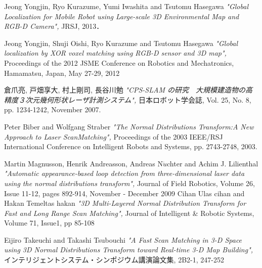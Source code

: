 \begin{thebibliography}{9}
	Jeong Yongjin, Ryo Kurazume, Yumi Iwashita and Tsutomu Hasegawa
	{\itshape "Global Localization for Mobile Robot using Large-scale 3D Environmental Map and RGB-D Camera",}
	 JRSJ, 2013．

	Jeong Yongjin, Shuji Oishi, Ryo Kurazume and Tsutomu Hasegawa
	{\itshape "Global localization by XOR voxel matching using RGB-D sensor and 3D map",}
	Proceedings of the 2012 JSME Conference on Robotics and Mechatronics, Hamamatsu, Japan, May 27-29, 2012 

	倉爪亮, 戸畑享大, 村上剛司, 長谷川勉
	{\itshape "CPS-SLAM の研究　大規模建造物の高精度３次元幾何形状レーザ計測システム",}
	日本ロボット学会誌, Vol. 25, No. 8, pp. 1234-1242, November 2007.

	Peter Biber and Wolfgang Straber
	{\itshape "The Normal Distributions Transform:A New Approach to Laser ScanMatching",}
	Proceedings of the 2003 IEEE/RSJ International Conference on Intelligent Robots and Systems, pp.
	2743-2748, 2003.

	Martin Magnusson, Henrik Andreasson, Andreas N$\ddot{u}$chter and Achim J. Lilienthal
	{\itshape "Automatic appearance-based loop detection from three-dimensional laser data using the normal distributions transform",}
	Journal of Field Robotics, Volume 26, Issue 11-12,  pages 892-914, November - December 2009
	Cihan Ulas cihan and Hakan Temeltas hakan
	{\itshape "3D Multi-Layered Normal Distribution Transform for Fast and Long Range Scan Matching",} 
	Journal of Intelligent \& Robotic Systems, Volume 71, Issue1, pp 85-108 

	Eijiro Takeuchi and Takashi Tsubouchi
	{\itshape "A Fast Scan Matching in 3-D Space using 3D Normal Distributions Transform toward Real-time 3-D Map Building",} 
	インテリジェントシステム・シンポジウム講演論文集, 2B2-1, 247-252
	
\end{thebibliography}